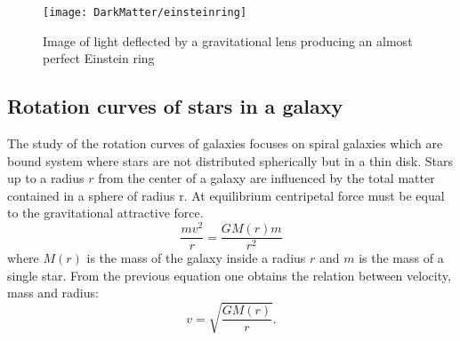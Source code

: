\begin{figure}[pt]
\centering
\texttt{[image: DarkMatter/einsteinring]}
\caption{Image of light deflected by a gravitational lens producing an almost perfect Einstein ring}
\label{fig:einsteinring}
\end{figure}



   
\subsection{Rotation curves of stars in a galaxy}
\label{sec:rotcurves}
The study of the rotation curves of galaxies focuses on spiral galaxies which are bound system where stars are not distributed spherically but in a thin disk. Stars up to a radius $r$ from the center of a galaxy are influenced by the total matter contained in a sphere of radius r. At equilibrium centripetal force must be equal to the gravitational attractive force.
\begin{equation}
\frac{mv^2}{r}=\frac{GM(r)m}{r^2}
\label{previous}
\end{equation}
where $M(r)$ is the mass of the galaxy inside a radius $r$ and $m$ is the mass of a single star. From the previous equation one obtains the relation between velocity, mass and radius:
\begin{equation}
v=\sqrt{\frac{GM(r)}{r}}.
\end{equation}

